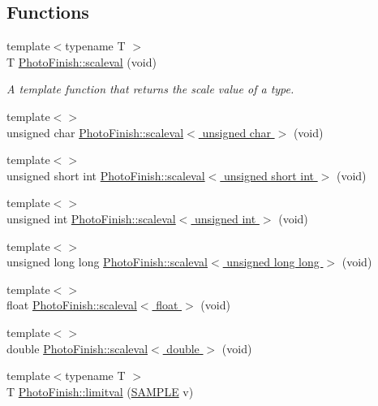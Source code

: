 \subsection*{Functions}
\begin{DoxyCompactItemize}
\item 
{\footnotesize template$<$typename T $>$ }\\T \hyperlink{namespace_photo_finish_a1bfb8180736f3b2786f47361d7586f2c}{Photo\+Finish\+::scaleval} (void)
\begin{DoxyCompactList}\small\item\em A template function that returns the \textquotesingle{}scale\textquotesingle{} value of a type. \end{DoxyCompactList}\item 
{\footnotesize template$<$$>$ }\\unsigned char \hyperlink{namespace_photo_finish_a653d84177058782ef68b4c5f5c0c5acc}{Photo\+Finish\+::scaleval$<$ unsigned char $>$} (void)
\item 
{\footnotesize template$<$$>$ }\\unsigned short int \hyperlink{namespace_photo_finish_adbb257b26d8f342162ba6dda2fc32601}{Photo\+Finish\+::scaleval$<$ unsigned short int $>$} (void)
\item 
{\footnotesize template$<$$>$ }\\unsigned int \hyperlink{namespace_photo_finish_a82d48fcde01b1e834f627a2f6ab6befc}{Photo\+Finish\+::scaleval$<$ unsigned int $>$} (void)
\item 
{\footnotesize template$<$$>$ }\\unsigned long long \hyperlink{namespace_photo_finish_aaaa916ac04c95a407348efa5420efd0f}{Photo\+Finish\+::scaleval$<$ unsigned long long $>$} (void)
\item 
{\footnotesize template$<$$>$ }\\float \hyperlink{namespace_photo_finish_a5a36600ec83f00881b849f7fb26666dc}{Photo\+Finish\+::scaleval$<$ float $>$} (void)
\item 
{\footnotesize template$<$$>$ }\\double \hyperlink{namespace_photo_finish_abfdbadb0978c56b817c27939adc53c23}{Photo\+Finish\+::scaleval$<$ double $>$} (void)
\item 
{\footnotesize template$<$typename T $>$ }\\T \hyperlink{namespace_photo_finish_aa019419c2456e119283e24d6e6fa3cbb}{Photo\+Finish\+::limitval} (\hyperlink{sample_8h_afc597c76b4f04a2da506a240d51d89a0}{S\+A\+M\+P\+LE} v)

\end{DoxyCompactItemize}
